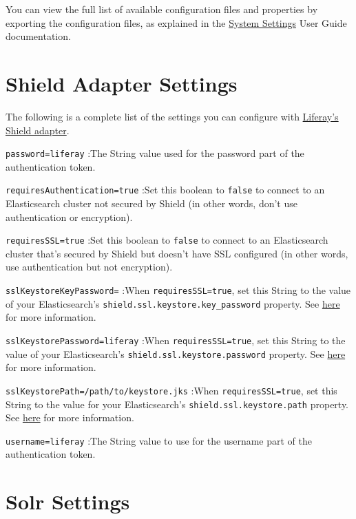 You can view the full list of available configuration files and
properties by exporting the configuration files, as explained in the
\href{/docs/7-0/user/-/knowledge_base/u/system-settings\#exporting-and-importing-configurations}{System
Settings} User Guide documentation.

\section{Shield Adapter Settings}\label{shield-adapter-settings}

The following is a complete list of the settings you can configure with
\href{/docs/7-0/deploy/-/knowledge_base/d/securing-elasticsearch-with-shield}{Liferay's
Shield adapter}.

\texttt{password=liferay} :The String value used for the password part
of the authentication token.

\texttt{requiresAuthentication=true} :Set this boolean to \texttt{false}
to connect to an Elasticsearch cluster not secured by Shield (in other
words, don't use authentication or encryption).

\texttt{requiresSSL=true} :Set this boolean to \texttt{false} to connect
to an Elasticsearch cluster that's secured by Shield but doesn't have
SSL configured (in other words, use authentication but not encryption).

\texttt{sslKeystoreKeyPassword=} :When \texttt{requiresSSL=true}, set
this String to the value of your Elasticsearch's
\texttt{shield.ssl.keystore.key\_password} property. See
\href{https://www.elastic.co/guide/en/shield/2.2/ssl-tls.html\#enable-ssl}{here}
for more information.

\texttt{sslKeystorePassword=liferay} :When \texttt{requiresSSL=true},
set this String to the value of your Elasticsearch's
\texttt{shield.ssl.keystore.password} property. See
\href{https://www.elastic.co/guide/en/shield/2.2/ssl-tls.html\#enable-ssl}{here}
for more information.

\texttt{sslKeystorePath=/path/to/keystore.jks} :When
\texttt{requiresSSL=true}, set this String to the value for your
Elasticsearch's \texttt{shield.ssl.keystore.path} property. See
\href{https://www.elastic.co/guide/en/shield/2.2/ssl-tls.html\#enable-ssl}{here}
for more information.

\texttt{username=liferay} :The String value to use for the username part
of the authentication token.

\section{Solr Settings}\label{solr-settings}

